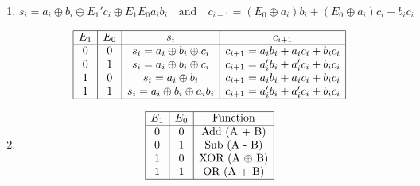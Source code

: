 


\begin{latin}
	\begin{enumerate}
		\item
		\[ 
		s_i = a_i \oplus b_i \oplus E_1'c_i \oplus E_1E_0a_ib_i 
		\quad \text{and} \quad 
		c_{i+1} = (E_0 \oplus a_i)b_i + (E_0 \oplus a_i)c_i + b_ic_i
		\]
		
		
		\[
		\begin{array}{|c|c|c|c|}
			\hline
			E_1 & E_0 & s_i & c_{i+1} \\
			\hline
			0 & 0 & s_i = a_i \oplus b_i \oplus c_i & c_{i+1} = a_ib_i + a_ic_i + b_ic_i \\
			0 & 1 & s_i = a_i \oplus b_i \oplus c_i & c_{i+1} = a_i'b_i + a_i'c_i + b_ic_i \\
			1 & 0 & s_i = a_i \oplus b_i & c_{i+1} = a_ib_i + a_ic_i + b_ic_i \\
			1 & 1 & s_i = a_i \oplus b_i \oplus a_ib_i & c_{i+1} = a_i'b_i + a_i'c_i + b_ic_i \\
			\hline
		\end{array}
		\]
		
		
		
		
		
		\item 
		\[
		\begin{array}{|c|c|c|}
			\hline
			E_1 & E_0 & \text{Function} \\
			\hline
			0 & 0 & \text{Add (A + B)} \\
			0 & 1 & \text{Sub (A - B)} \\
			1 & 0 & \text{XOR (A $\oplus$ B)} \\
			1 & 1 & \text{OR (A + B)} \\
			\hline
		\end{array}
		\]
	\end{enumerate}
\end{latin}
